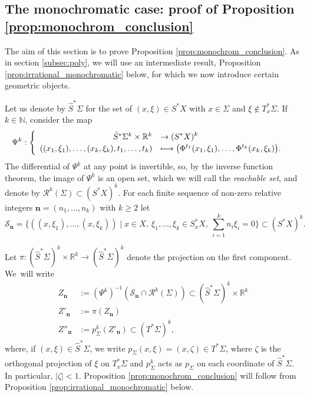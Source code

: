 \documentclass[10pt]{amsart}
\let\mathcal\mathscr
\newcommand\mto{\mathchoice{\longmapsto}{\mapsto}{\mapsto}{\mapsto}}
\let\sep\mid
\theoremstyle{plain}
\theoremstyle{definition}
\newcommand{\N}{\mathbb{N}}
\newcommand{\R}{\mathbb{R}}
\def\calS{\mathcal{S}}
\let\dpl\displaystyle
\begin{document}
\subsection{The monochromatic case: proof of Proposition \ref{prop:monochrom_conclusion}}\label{subsec:mono}

The aim of this section is to prove Proposition \ref{prop:monochrom_conclusion}. As in section \ref{subsec:poly}, we will use an intermediate result, Proposition \ref{prop:irrational_monochromatic} below, for which we now introduce certain geometric objects.

Let us denote by $\hat S^*\Sigma$ for the set of $(x,\xi)\in S^*X$ with $x\in \Sigma$ and $\xi\notin T_x^*\Sigma$. If~$k\in \N$, consider the map
\[
\Psi^k : \begin{cases} \begin{array}{rl}
\hat{S}^*\Sigma^k \times \R^k &\dpl\to (S^*X)^k\\
((x_1,\xi_1),\dots, (x_k, \xi_k),t_1,\dots,t_k) &\dpl\mto \bigl(\Phi^{t_1}(x_1,\xi_1),\dots, \Phi^{t_k}(x_k,\xi_k)\bigr).
\end{array}
\end{cases}
\]
The differential of $\Psi^k$ at any point is invertible, so, by the inverse function theorem, the image of $\Psi^k$ is an open set, which we will call the \emph{reachable set}, and denote by $\mathcal{R}^k(\Sigma)\subset (S^*X)^k$. For each finite sequence of non-zero relative integers $\boldsymbol{n}=(n_1,\dots,n_k)$ with $k\geq 2$ let
\[
\calS_{\boldsymbol{n}}=\bigl\{((x,\xi_1),\dots,(x,\xi_k))\sep x\in X,\ \xi_1,\dots,\xi_k\in S^*_xX,\ \textstyle\sum_{i=1}^k n_i\xi_i=0\bigr\}\subset (S^*X)^k.
\]

Let $\pi : (\hat{S}^*\Sigma)^k \times \R^k \to (\hat{S}^*\Sigma)^k$ denote the projection on the first component.
We~will write
\begin{align*}
Z_{\boldsymbol{n}} &:= (\Psi^k)^{-1} \left(\calS_{\boldsymbol{n}} \cap \mathcal{R}^k(\Sigma) \right)\subset (\hat{S}^*\Sigma)^k \times \R^k \\
Z'_{\boldsymbol{n}} &:= \pi(Z_{\boldsymbol{n}})\\
Z''_{\boldsymbol{n}} &:=p_\Sigma^k (Z'_{\boldsymbol{n}}) \subset (T^*\Sigma)^k,
\end{align*}
where, if $(x,\xi)\in \hat{S}^*\Sigma$, we write $p_\Sigma(x,\xi) = (x,\zeta)\in T^*\Sigma$, where $\zeta$ is the orthogonal projection of $\xi$ on $T_x^*\Sigma$ and $p_\Sigma^k$ acts as $p_\Sigma$ on each coordinate of $\hat{S}^*\Sigma$. In particular, $|\zeta|<1$. Proposition \ref{prop:monochrom_conclusion} will follow from Proposition \ref{prop:irrational_monochromatic} below.
\end{document}
